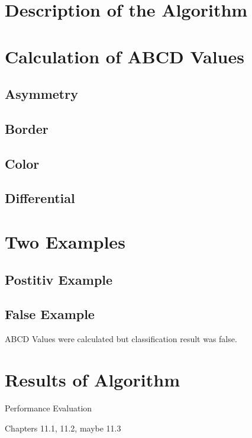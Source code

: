 \section{Description of the Algorithm}

\section{Calculation of ABCD Values}
\subsection{Asymmetry}
\subsection{Border}
\subsection{Color}
\subsection{Differential}

\section{Two Examples}
\subsection{Postitiv Example}

\subsection{False Example}

ABCD Values were calculated but classification result was false.

\section{Results of Algorithm}

Performance Evaluation

Chapters 11.1, 11.2, maybe 11.3
